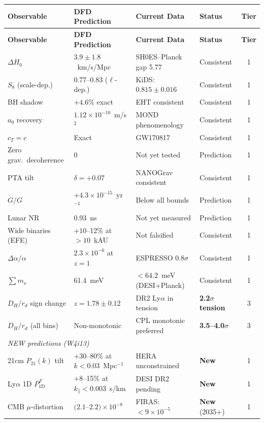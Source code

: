 \documentclass[11pt,a4paper]{article}
\newcommand{\ee}[1]{\times 10^{#1}}
\begin{document}
\begin{longtable}{p{4cm}p{3cm}p{3cm}p{2.5cm}c}
\toprule
\textbf{Observable} & \textbf{DFD Prediction} & \textbf{Current Data} &
  \textbf{Status} & \textbf{Tier} \\
\midrule
\endfirsthead
\toprule
\textbf{Observable} & \textbf{DFD Prediction} & \textbf{Current Data} &
  \textbf{Status} & \textbf{Tier} \\
\midrule
\endhead
$\Delta H_0$ & $3.9 \pm 1.8$~km/s/Mpc & SH0ES--Planck gap 5.77 & Consistent & 1 \\
$S_8$ (scale-dep.) & 0.77--0.83 ($\ell$-dep.) & KiDS: $0.815 \pm 0.016$ & Consistent & 1 \\
BH shadow & $+4.6\%$ exact & EHT consistent & Consistent & 1 \\
$a_0$ recovery & $1.12\ee{-10}$~m/s$^2$ & MOND phenomenology & Consistent & 1 \\
$c_T = c$ & Exact & GW170817 & Consistent & 1 \\
Zero grav.\ decoherence & 0 & Not yet tested & Prediction & 1 \\
PTA tilt & $\delta = +0.07$ & NANOGrav consistent & Consistent & 1 \\
$\dot{G}/G$ & $+4.3\ee{-15}$~yr$^{-1}$ & Below all bounds & Prediction & 1 \\
Lunar NR & 0.93~ns & Not yet measured & Prediction & 1 \\
Wide binaries (EFE) & $+10$--12\% at $>10$~kAU & Not falsified & Consistent & 1 \\
$\Delta\alpha/\alpha$ & $2.3\ee{-6}$ at $z=1$ & ESPRESSO $0.8\sigma$ & Consistent & 1 \\
$\sum m_\nu$ & 61.4~meV & $<64.2$~meV (DESI+Planck) & Consistent & 1 \\
\midrule
$D_H/r_d$ sign change & $z = 1.78 \pm 0.12$ & DR2 Ly$\alpha$ in tension & \textbf{2.2$\sigma$ tension} & 3 \\
$D_H/r_d$ (all bins) & Non-monotonic & CPL monotonic preferred & \textbf{3.5--4.0$\sigma$} & 3 \\
\midrule
\multicolumn{5}{l}{\textit{NEW predictions (W4i13)}} \\
\midrule
21cm $P_{21}(k)$ tilt & $+30$--80\% at $k < 0.03$~Mpc$^{-1}$ & HERA unconstrained & \textbf{New} & 1 \\
Ly$\alpha$ 1D $P^F_{1\text{D}}$ & $+8$--15\% at $k_\parallel < 0.003$~s/km & DESI DR2 pending & \textbf{New} & 1 \\
CMB $\mu$-distortion & $(2.1$--$2.2)\ee{-8}$ & FIRAS: $<9\ee{-5}$ & \textbf{New} (2035+) & 1 \\
\bottomrule
\end{longtable}
\end{document}
